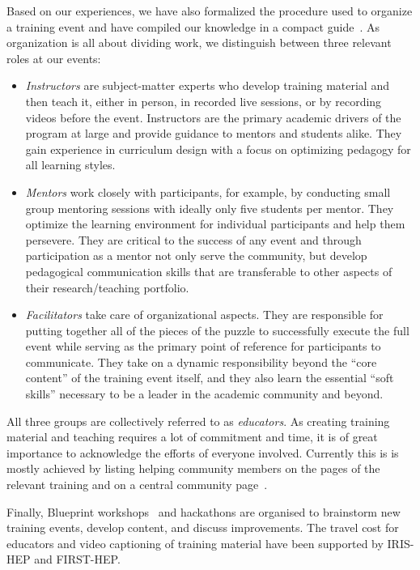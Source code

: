\documentclass[twocolumn]{svjour3}          %
\begin{document}
Based on our experiences, we have also formalized the procedure used to organize  a training event and have compiled our knowledge in a compact guide~\cite{HSF-training-how-to}.
As organization is all about dividing work, we distinguish between three relevant roles at our events:
\begin{itemize}
    \item \emph{Instructors} are subject-matter experts who develop training material and then teach it, either in person, in recorded live sessions, or by recording videos before the event.  Instructors are the primary academic drivers of the program at large and provide guidance to mentors and students alike. They gain experience in curriculum design with a focus on optimizing pedagogy for all learning styles.
    \item \emph{Mentors} work closely with participants, for example, by conducting small group mentoring sessions with ideally only five students per mentor. They optimize the learning environment for individual participants and help them persevere.  They are critical to the success of any event and through participation as a mentor not only serve the community, but develop pedagogical communication skills that are transferable to other aspects of their research/teaching portfolio.
    \item \emph{Facilitators} take care of organizational aspects. They are responsible for putting together all of the pieces of the puzzle to successfully execute the full event while serving as the primary point of reference for participants to communicate. They take on a dynamic responsibility beyond the \enquote{core content} of the training event itself, and they also learn the essential \enquote{soft skills} necessary to be a leader in the academic community and beyond.
\end{itemize}
All three groups are collectively referred to as \emph{educators}.
As creating training material and teaching requires a lot of commitment and time, it is of great importance to acknowledge the efforts of everyone involved. Currently this is is mostly achieved by listing helping community members on the pages of the relevant training and on a central community page~\cite{HSF-training-community}.

Finally, Blueprint workshops~\cite{HSF-training-blueprint} and hackathons \cite{HSF-training-hackathon} are organised to brainstorm new training events, develop content, and discuss improvements. The travel cost for educators and video captioning of training material have been supported by IRIS-HEP and FIRST-HEP.
\end{document}
